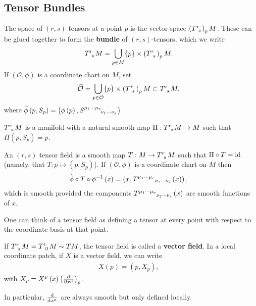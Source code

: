 \subsection{Tensor Bundles}

\begin{definition}
    The space of $\left( r,s \right) $ tensors at a point $p$ is the vector space $\left( \tensor{T}{^{r}_s} \right)_p M$. These can be glued together to form the \textbf{bundle} of $\left( r,s \right) $-tensors, which we write 
    \begin{align}
        \tensor{T}{^{r}_s}M = \bigcup_{p \in M} \{p\} \times \left( \tensor{T}{^{r}_s} \right)_p M 
    .\end{align}
    If $\left( \mathcal{O},\phi \right) $ is a coordinate chart on $M$, set
    \begin{align}
        \widetilde{\mathcal{O}} = \bigcup_{p \in \mathcal{O}} \{p\}  \times \left( \tensor{T}{^{r}_{s}} \right)_p M \subset \tensor{T}{^{r}_{s}}M 
    ,\end{align}
    where $\widetilde{\phi}\left( p, S_p \right) = \left( \phi \left( p \right) , \tensor{S}{^{\mu_1 \cdots \mu_r}_{\nu_1 \cdots \nu_s}} \right)$
\end{definition}

$\tensor{T}{^{r}_s}M$ is a manifold with a natural smooth map $\Pi : \tensor{T}{^{r}_s}M \to M$ such that $\Pi \left( p, S_p \right) = p$.

\begin{definition}
    An $\left( r,s \right) $ tensor field is a smooth map $T : M \to \tensor{T}{^{r}_s} M$ such that $\Pi \circ T = \text{id}$ (namely, that $T : p\mapsto \left( p, S_p \right) $). If $\left( \mathcal{O}, \phi \right) $ is a coordinate chart on $M$ then
    \begin{align}
        \widetilde{\phi} \circ T \circ \phi^{-1}\left( x \right) = \left( x, \tensor{T}{^{\mu_1 \cdots \mu_r}}_{\nu_1 \cdots \nu_s}\left( x \right)  \right) 
    ,\end{align}
    which is smooth provided the components $\tensor{T}{^{\mu_1 \cdots \mu_r}}_{\nu_1 \cdots \nu_s}\left( x \right)$ are smooth functions of $x$.
\end{definition}

One can think of a tensor field as defining a tensor at every point with respect to the coordinate basis at that point.

If $\tensor{T}{^{r}_s} M = \tensor{T}{^{1}_0} M \sim TM$, the tensor field is called a \textbf{vector field}. In a local coordinate patch, if $X$ is a vector field, we can write
\begin{align}
    X \left( p \right) = \left( p, X_p \right) 
,\end{align}
with $X_p = X^{\mu} \left( x \right) \left( \pdv{x^{\mu}} \right)_p $.

In particular, $\dv{x^{\mu}}$ are always smooth but only defined locally.


